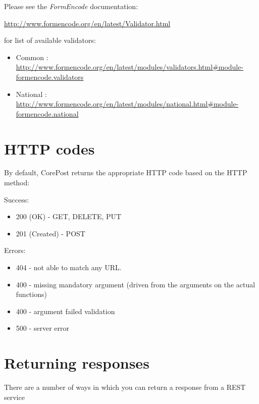 \documentclass[letterpaper,10pt,english]{sphinxmanual}
\begin{document}
Please see the \emph{FormEncode} documentation:

\href{http://www.formencode.org/en/latest/Validator.html}{http://www.formencode.org/en/latest/Validator.html}

for list of available validators:
\begin{itemize}
\item {} 
Common : \href{http://www.formencode.org/en/latest/modules/validators.html\#module-formencode.validators}{http://www.formencode.org/en/latest/modules/validators.html\#module-formencode.validators}

\item {} 
National : \href{http://www.formencode.org/en/latest/modules/national.html\#module-formencode.national}{http://www.formencode.org/en/latest/modules/national.html\#module-formencode.national}

\end{itemize}


\section{HTTP codes}
\label{http_codes::doc}\label{http_codes:http-codes}
By default, CorePost returns the appropriate HTTP code based on the HTTP method:

Success:
\begin{itemize}
\item {} 
200 (OK) - GET, DELETE, PUT

\item {} 
201 (Created) - POST

\end{itemize}

Errors:
\begin{itemize}
\item {} 
404 - not able to match any URL.

\item {} 
400 - missing mandatory argument (driven from the arguments on the actual functions)

\item {} 
400 - argument failed validation

\item {} 
500 - server error

\end{itemize}


\section{Returning responses}
\label{responses::doc}\label{responses:returning-responses}
There are a number of ways in which you can return a response from a REST service
\end{document}
